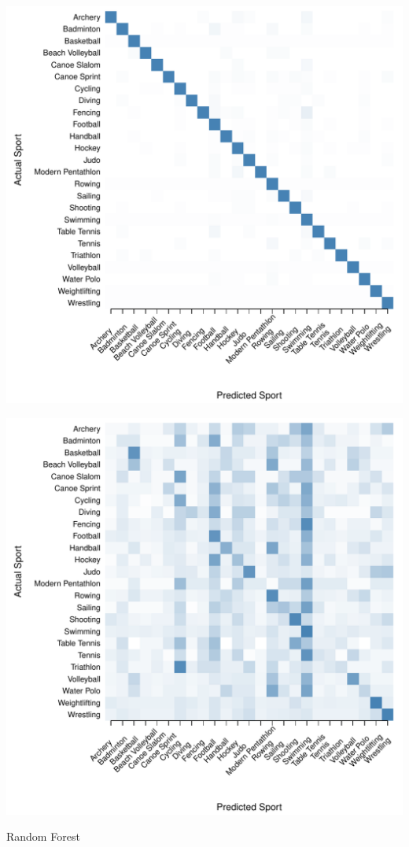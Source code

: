\documentclass[landscape, paperwidth=42in, paperheight=36in,
fontscale=.35, margin=1in]{baposter}
\begin{document}
\begin{poster}
{\begin{center}
  \begin{minipage}{0.45\textwidth}
    \begin{center}
      \includegraphics[scale=0.27]{../graphics/sportRF-trn.pdf}
    \end{center}
  \end{minipage}
  \hspace{0.05\textwidth}
  \begin{minipage}{0.45\textwidth}
    \begin{center}
      \includegraphics[scale=0.27]{../graphics/sportRF-tst.pdf}
    \end{center}
  \end{minipage}
  Random Forest \\




\end{center}}
\end{poster}
\end{document}
